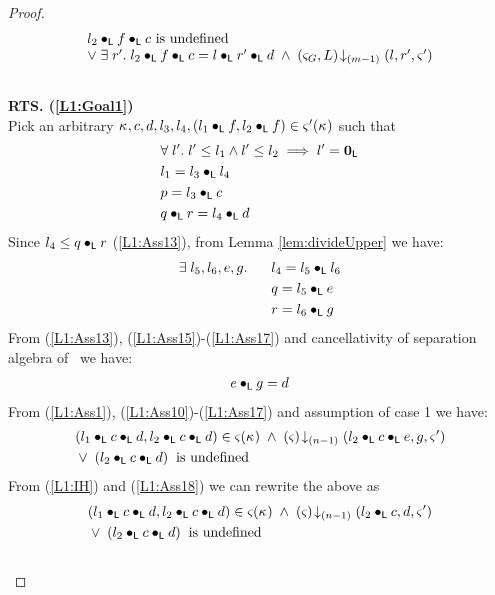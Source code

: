 \begin{lemma}
\begin{proof}
\begin{align}
\begin{array}{l}
\begin{array}{l l}
			l_2 \bullet_{\textsf{L}} f \bullet_{\textsf{L}} c \text{ is undefined}\\
			\lor\; \exists\; r'.\; l_2 \bullet_{\textsf{L}} f \bullet_{\textsf{L}} c = l \bullet_{\textsf{L}} r' \bullet_{\textsf{L}} d \;\land\; \left(\varsigma_{G}, L\right) \!\downarrow_{(m-1)} \left(l, r', \varsigma_{}'\right)
		\end{array}
	\end{array}
	\label{L1:Goal2}\\\nonumber
\end{align}
%
\textbf{RTS. (\ref{L1:Goal1})}\\
Pick an arbitrary $\kappa_{}, c, d, l_3, l_4, (l_1 \bullet_{\textsf{L}} f, l_2 \bullet_{\textsf{L}} f) \in \varsigma_{}'(\kappa_{})$ such that
%
\begin{align}
	&\forall\; l'.\; l' \leq l_1 \land l' \leq l_2 \implies l' = \mathbf{0}_{\textsf{L}} \label{L1:Ass10}\\
	& l_1 = l_3 \bullet_{\textsf{L}} l_4 \label{L1:Ass11}\\
	& p = l_3 \bullet_{\textsf{L}} c \label{L1:Ass12}\\
	& q \bullet_{\textsf{L}} r = l_4 \bullet_{\textsf{L}} d \label{L1:Ass13}
\end{align}
Since $l_4 \leq q \bullet_{\textsf{L}} r$ (\ref{L1:Ass13}), from Lemma \ref{lem:divideUpper} we have:
%
\begin{align}
	\exists\; l_5, l_6, e, g.\; \hspace*{0.5cm} & l_4 = l_5 \bullet_{\textsf{L}} l_6 \label{L1:Ass15}\\
	& q = l_5 \bullet_{\textsf{L}} e \label{L1:Ass16}\\
	& r = l_6 \bullet_{\textsf{L}} g \label{L1:Ass17}
\end{align}
%
From (\ref{L1:Ass13}), (\ref{L1:Ass15})-(\ref{L1:Ass17}) and cancellativity of separation algebra of \LState\ we have:
%
\begin{align}
	e \bullet_{\textsf{L}} g = d \label{L1:Ass18}
\end{align}
%
From (\ref{L1:Ass1}), (\ref{L1:Ass10})-(\ref{L1:Ass17}) and assumption of case 1 we have:
%
\begin{align}
	&(l_1 \bullet_{\textsf{L}} c \bullet_{\textsf{L}}  d, l_2 \bullet_{\textsf{L}} c \bullet_{\textsf{L}} d) \in \varsigma_{}(\kappa_{}) \;\land\;\left(\varsigma_{}\right) \!\downarrow_{(n-1)} \left(l_2 \bullet_{\textsf{L}} c \bullet_{\textsf{L}} e, g, \varsigma_{}'\right)  \nonumber\\
	&\lor\; (l_2 \bullet_{\textsf{L}} c \bullet_{\textsf{L}} d) \hspace*{0.2cm}\text{is undefined} \nonumber
\end{align}
From (\ref{L1:IH}) and (\ref{L1:Ass18}) we can rewrite the above as 
%
\begin{align}
	&(l_1 \bullet_{\textsf{L}} c \bullet_{\textsf{L}}  d, l_2 \bullet_{\textsf{L}} c \bullet_{\textsf{L}} d) \in \varsigma_{}(\kappa_{}) \;\land\;\left(\varsigma_{}\right) \!\downarrow_{(n-1)} \left(l_2 \bullet_{\textsf{L}} c, d, \varsigma_{}'\right)  \nonumber\\
	&\lor\; (l_2 \bullet_{\textsf{L}} c \bullet_{\textsf{L}} d) \hspace*{0.2cm}\text{is undefined} \nonumber
\end{align}\\
%
%
%
%


\end{proof}
\end{lemma}
